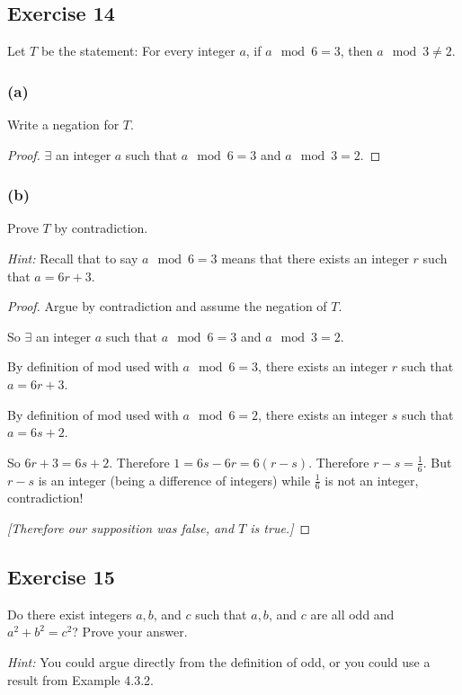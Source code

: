 \documentclass[14pt]{extarticle}
\newcommand{\te}{\exists}
\begin{document}
\subsection{Exercise 14}
Let $T$ be the statement: For every integer $a$, if $a \mod 6 = 3$, then $a \mod 3 \neq 2$.

\subsubsection{(a)}
Write a negation for $T$.

\begin{proof}
    $\te$ an integer $a$ such that $a \mod 6 = 3$ and $a \mod 3 = 2$.
\end{proof}

\subsubsection{(b)}
Prove $T$ by contradiction.

    {\it Hint:} Recall that to say $a \mod 6 = 3$ means that there exists an integer $r$ such that $a = 6r + 3$.

\begin{proof}
    Argue by contradiction and assume the negation of $T$.

    So $\te$ an integer $a$ such that $a \mod 6 = 3$ and $a \mod 3 = 2$.

    By definition of mod used with $a \mod 6 = 3$, there exists an integer $r$ such that $a = 6r + 3$.

    By definition of mod used with $a \mod 6 = 2$, there exists an integer $s$ such that $a = 6s + 2$.

    So $6r + 3 = 6s + 2$. Therefore $1 = 6s - 6r = 6(r-s)$. Therefore $r-s = \frac{1}{6}$. But $r-s$ is an integer (being a difference of integers) while $\frac{1}{6}$ is not an integer, contradiction!

    {\it [Therefore our supposition was false, and $T$ is true.]}
\end{proof}

\subsection{Exercise 15}
Do there exist integers $a, b$, and $c$ such that $a, b$, and $c$ are all odd and $a^2 + b^2 = c^2$? Prove your answer.

    {\it Hint:} You could argue directly from the definition of odd, or you could use a result from Example 4.3.2.
\end{document}
